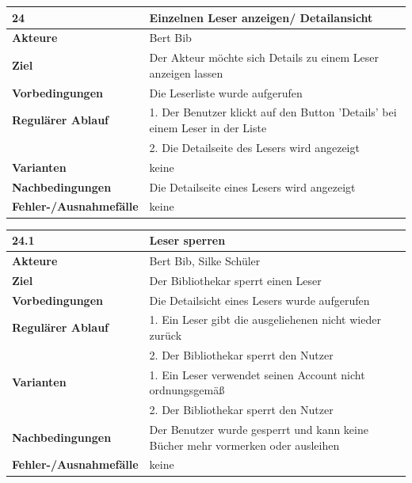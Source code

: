 \documentclass[fontsize=12pt,paper=a4,twoside]{scrartcl}
\begin{document}
\begin{table}[htbp]
\label{24}
\begin{tabular}{|l|p{10cm}|}
\hline 
\textbf{24} & \textbf{Einzelnen Leser anzeigen/ Detailansicht} \\ \hline
\textbf{Akteure} & Bert Bib\\ \hline
\textbf{Ziel} & Der Akteur möchte sich Details zu einem Leser anzeigen lassen \\ \hline
\textbf{Vorbedingungen} & Die Leserliste wurde aufgerufen \\ \hline
\textbf{Regulärer Ablauf} & 
1. Der Benutzer klickt auf den Button 'Details' bei einem Leser in der Liste \\
&2. Die Detailseite des Lesers wird angezeigt\\
\hline
\textbf{Varianten} & 
keine \\ \hline
\textbf{Nachbedingungen} & Die Detailseite eines Lesers wird angezeigt\\ \hline
\textbf{Fehler-/Ausnahmefälle} & keine\\
\hline
\end{tabular}
\end{table}

\newpage

\begin{table}[!htbp]
\label{24.1}
\begin{tabular}{|l|p{10cm}|}
\hline 
\textbf{24.1} & \textbf{Leser sperren} \\ \hline
\textbf{Akteure} & Bert Bib, Silke Schüler\\ \hline
\textbf{Ziel} & Der Bibliothekar sperrt einen Leser \\ \hline
\textbf{Vorbedingungen} & Die Detailsicht eines Lesers wurde aufgerufen \\ \hline
\textbf{Regulärer Ablauf} & 
1. Ein Leser gibt die ausgeliehenen nicht wieder zurück\\
&2. Der Bibliothekar sperrt den Nutzer\\
\hline
\textbf{Varianten} & 
1. Ein Leser verwendet seinen Account nicht ordnungsgemäß\\
&2. Der Bibliothekar sperrt den Nutzer\\ \hline
\textbf{Nachbedingungen} & Der Benutzer wurde gesperrt und kann keine Bücher mehr vormerken oder 
ausleihen\\ \hline
\textbf{Fehler-/Ausnahmefälle} & keine\\
\hline
\end{tabular}
\end{table}
\end{document}
